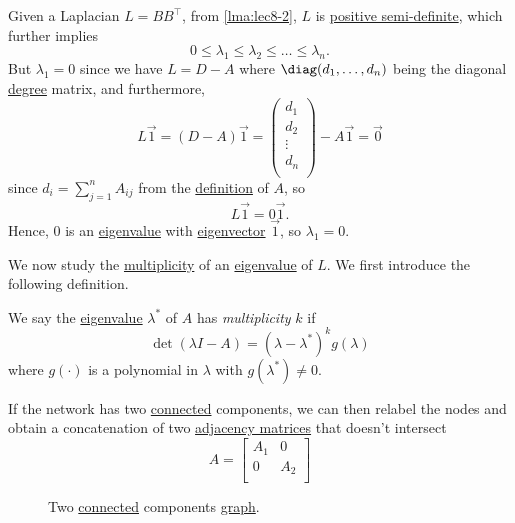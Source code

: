 \begin{remark}\label{rmk:property-of-Laplacian}
	Given a Laplacian \(L = B B^{\top}\), from \autoref{lma:lec8-2}, \(L\) is \hyperref[def:positive-semi-definite]{positive semi-definite},
	which further implies
	\[
		0 \leq \lambda_1 \leq \lambda_2 \leq \ldots \leq \lambda_n.
	\]
	But \(\lambda_1 = 0\) since we have \(L = D-A\) where \(\diag(d_1, \ldots , d_n)\) being the diagonal \hyperref[def:degree]{degree} matrix,
	and furthermore,
	\[
		L \vec{1} = (D - A)\vec{1} = \begin{pmatrix}
			d_1    \\
			d_2    \\
			\vdots \\
			d_n    \\
		\end{pmatrix} - A\vec{1} = \vec{0}
	\]
	since \(d_{i} = \sum_{j=1}^{n} A_{ij}\) from the \hyperref[def:adjacency-matrix]{definition} of \(A\), so
	\[
		L \vec{1} = 0 \vec{1}.
	\]
	Hence, \(0\) is an \hyperref[def:eigenvalue]{eigenvalue} with \hyperref[def:eigenvector]{eigenvector} \(\vec{1}\), so \(\lambda _1=0\).
\end{remark}

We now study the \hyperref[def:multiplicity]{multiplicity} of an \hyperref[def:eigenvalue]{eigenvalue} of \(L\). We first introduce the following definition.
\begin{definition}[Multiplicity]\label{def:multiplicity}
	We say the \hyperref[def:eigenvalue]{eigenvalue} \(\lambda ^{\ast} \) of \(A\) has \emph{multiplicity} \(k\) if
	\[
		\det(\lambda I - A) = (\lambda - \lambda ^{\ast} )^k g(\lambda )
	\]
	where \(g(\cdot)\) is a polynomial in \(\lambda\) with \(g(\lambda ^{\ast} )\neq 0\).
\end{definition}

If the network has two \hyperref[def:connected]{connected} components, we can then relabel the nodes and obtain a concatenation of two
\hyperref[def:adjacency-matrix]{adjacency matrices} that doesn't intersect
\[
	A = \begin{bmatrix}
		A_1 & 0   \\
		0   & A_2 \\
	\end{bmatrix}
\]
\begin{figure}[H]
	\centering
	\caption{Two \hyperref[def:connected]{connected} components \hyperref[def:graph]{graph}.}
	\label{fig:two-component-graph}
\end{figure}

